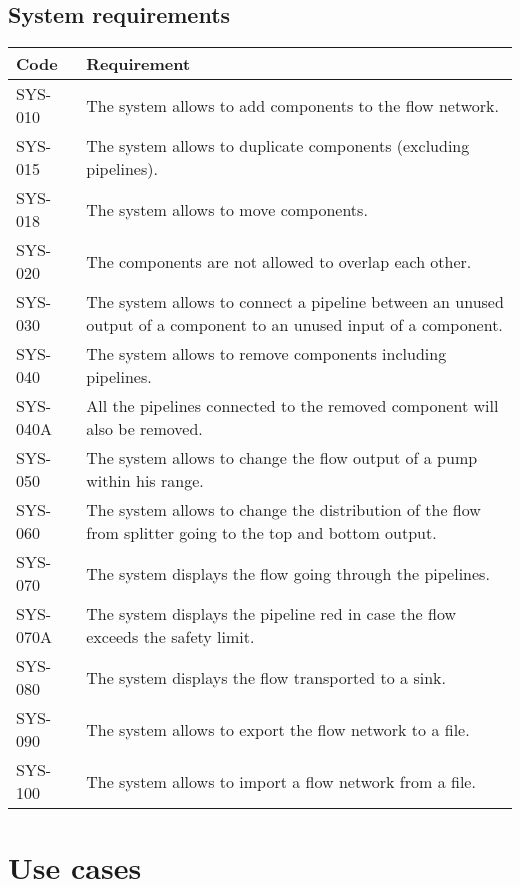 \subsection{System requirements}
\begin{tabularx}{\textwidth}{|p{2cm}X|}\hline
Code & Requirement \\\hline
SYS-010 & The system allows to add components to the flow network.\\\hline
SYS-015 & The system allows to duplicate components (excluding pipelines).\\\hline
SYS-018 & The system allows to move components.\\\hline
SYS-020 & The components are not allowed to overlap each other.\\\hline
SYS-030 & The system allows to connect a pipeline between an unused output of a component to an unused input of a component.\\\hline
SYS-040 & The system allows to remove components including pipelines.\\\hline
SYS-040A & All the pipelines connected to the removed component will also be removed.\\\hline
SYS-050 & The system allows to change the flow output of a pump within his range.\\\hline
SYS-060 & The system allows to change the distribution of the flow from splitter going to the top and bottom output.\\\hline
SYS-070 & The system displays the flow going through the pipelines.\\\hline
SYS-070A & The system displays the pipeline red in case the flow exceeds the safety limit.\\\hline
SYS-080 & The system displays the flow transported to a sink.\\\hline
SYS-090 & The system allows to export the flow network to a file.\\\hline
SYS-100 & The system allows to import a flow network from a file.\\\hline
\end{tabularx}

\section{Use cases}


